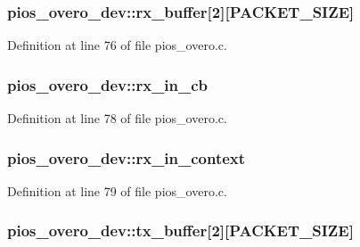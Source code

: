 \hypertarget{structpios__overo__dev_a638ed3a9ebc43e2ce3477041a7f68a95}{
\subsubsection[{rx\-\_\-buffer}]{ pios\-\_\-overo\-\_\-dev\-::rx\-\_\-buffer\mbox{[}2\mbox{]}\mbox{[}P\-A\-C\-K\-E\-T\-\_\-\-S\-I\-Z\-E\mbox{]}}}\label{structpios__overo__dev_a638ed3a9ebc43e2ce3477041a7f68a95}


Definition at line 76 of file pios\-\_\-overo.\-c.

\hypertarget{structpios__overo__dev_acba008cacb6d3478462b4c681b60a158}{
\subsubsection[{rx\-\_\-in\-\_\-cb}]{ pios\-\_\-overo\-\_\-dev\-::rx\-\_\-in\-\_\-cb}}\label{structpios__overo__dev_acba008cacb6d3478462b4c681b60a158}


Definition at line 78 of file pios\-\_\-overo.\-c.

\hypertarget{structpios__overo__dev_acd9b0fbbf1587d730b3a91eaeee52253}{
\subsubsection[{rx\-\_\-in\-\_\-context}]{ pios\-\_\-overo\-\_\-dev\-::rx\-\_\-in\-\_\-context}}\label{structpios__overo__dev_acd9b0fbbf1587d730b3a91eaeee52253}


Definition at line 79 of file pios\-\_\-overo.\-c.

\hypertarget{structpios__overo__dev_a48dfcb09b1a3c648ab7d1e2c79f4094e}{
\subsubsection[{tx\-\_\-buffer}]{ pios\-\_\-overo\-\_\-dev\-::tx\-\_\-buffer\mbox{[}2\mbox{]}\mbox{[}P\-A\-C\-K\-E\-T\-\_\-\-S\-I\-Z\-E\mbox{]}}}\label{structpios__overo__dev_a48dfcb09b1a3c648ab7d1e2c79f4094e}


